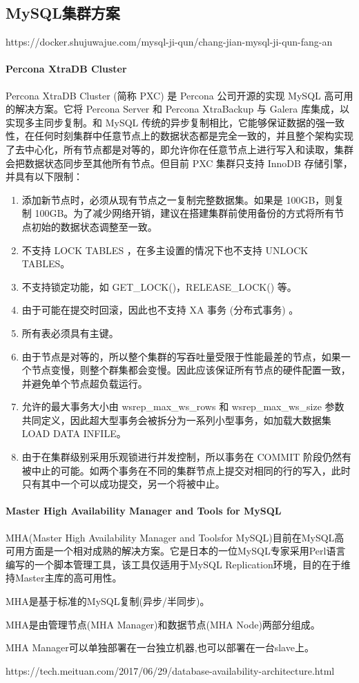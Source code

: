 \documentclass[../../../interview-questions.tex]{subfiles}
\begin{document}
\subsection{MySQL集群方案}

https://docker.shujuwajue.com/mysql-ji-qun/chang-jian-mysql-ji-qun-fang-an

\paragraph{Percona XtraDB Cluster }

Percona XtraDB Cluster (简称 PXC) 是 Percona 公司开源的实现 MySQL 高可用的解决方案。它将 Percona Server 和 Percona XtraBackup 与 Galera 库集成，以实现多主同步复制。和 MySQL 传统的异步复制相比，它能够保证数据的强一致性，在任何时刻集群中任意节点上的数据状态都是完全一致的，并且整个架构实现了去中心化，所有节点都是对等的，即允许你在任意节点上进行写入和读取，集群会把数据状态同步至其他所有节点。但目前 PXC 集群只支持 InnoDB 存储引擎，并具有以下限制：

\begin{enumerate}
    \item {添加新节点时，必须从现有节点之一复制完整数据集。如果是 100GB，则复制 100GB。为了减少网络开销，建议在搭建集群前使用备份的方式将所有节点初始的数据状态调整至一致。}
    \item {不支持 LOCK TABLES ，在多主设置的情况下也不支持 UNLOCK TABLES。}
    \item {不支持锁定功能，如 GET\_LOCK()，RELEASE\_LOCK() 等。}
    \item {由于可能在提交时回滚，因此也不支持 XA 事务 (分布式事务) 。}
    \item {所有表必须具有主键。}
    \item {由于节点是对等的，所以整个集群的写吞吐量受限于性能最差的节点，如果一个节点变慢，则整个群集都会变慢。因此应该保证所有节点的硬件配置一致，并避免单个节点超负载运行。}
    \item {允许的最大事务大小由 wsrep\_max\_ws\_rows 和 wsrep\_max\_ws\_size 参数共同定义，因此超大型事务会被拆分为一系列小型事务，如加载大数据集 LOAD DATA INFILE。}
    \item {由于在集群级别采用乐观锁进行并发控制，所以事务在 COMMIT 阶段仍然有被中止的可能。如两个事务在不同的集群节点上提交对相同的行的写入，此时只有其中一个可以成功提交，另一个将被中止。}
\end{enumerate}

\paragraph{Master High Availability Manager and Tools for MySQL}

MHA(Master High Availability Manager and Toolsfor MySQL)目前在MySQL高可用方面是一个相对成熟的解决方案。它是日本的一位MySQL专家采用Perl语言编写的一个脚本管理工具，该工具仅适用于MySQL Replication环境，目的在于维持Master主库的高可用性。

MHA是基于标准的MySQL复制(异步/半同步)。

MHA是由管理节点(MHA Manager)和数据节点(MHA Node)两部分组成。

MHA Manager可以单独部署在一台独立机器,也可以部署在一台slave上。

https://tech.meituan.com/2017/06/29/database-availability-architecture.html
\end{document}
